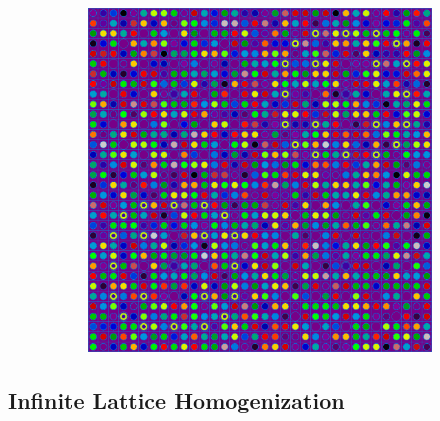 \begin{figure}[h!]
\begin{subfigure}{.5\textwidth}
  \caption{}
  \label{fig:chap8-2x2-null-materials}
\end{subfigure}%
\begin{subfigure}{.5\textwidth}
  \centering
  \includegraphics[width=0.9\linewidth]{figures/quantification/homogenization/2x2-degenerate-materials}
  \caption{}
  \label{fig:chap8-2x2-degenerate-materials}
\end{subfigure}
\label{fig:chap8-homogenization-schemes}
\end{figure}

\subsection{Infinite Lattice Homogenization}
\label{subsec:chap8-infinite}

